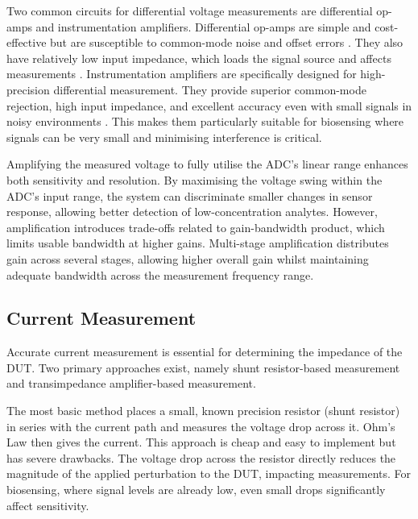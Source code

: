 Two common circuits for differential voltage measurements are differential op-amps and instrumentation amplifiers. Differential op-amps are simple and cost-effective but are susceptible to common-mode noise and offset errors \cite{technologyWhatAreDrawbacks2024}. They also have relatively low input impedance, which loads the signal source and affects measurements \cite{technologyWhatAreDrawbacks2024}. Instrumentation amplifiers are specifically designed for high-precision differential measurement. They provide superior common-mode rejection, high input impedance, and excellent accuracy even with small signals in noisy environments \cite{InstrumentationAmplifierOperational}. This makes them particularly suitable for biosensing where signals can be very small and minimising interference is critical.

Amplifying the measured voltage to fully utilise the \ac{ADC}'s linear range enhances both sensitivity and resolution. By maximising the voltage swing within the \ac{ADC}'s input range, the system can discriminate smaller changes in sensor response, allowing better detection of low-concentration analytes. However, amplification introduces trade-offs related to gain-bandwidth product, which limits usable bandwidth at higher gains. Multi-stage amplification distributes gain across several stages, allowing higher overall gain whilst maintaining adequate bandwidth across the measurement frequency range.

\subsection{Current Measurement}
Accurate current measurement is essential for determining the impedance of the \ac{DUT}. Two primary approaches exist, namely shunt resistor-based measurement and transimpedance amplifier-based measurement.

The most basic method places a small, known precision resistor (shunt resistor) in series with the current path and measures the voltage drop across it. Ohm's Law then gives the current. This approach is cheap and easy to implement but has severe drawbacks. The voltage drop across the resistor directly reduces the magnitude of the applied perturbation to the \ac{DUT}, impacting measurements. For biosensing, where signal levels are already low, even small drops significantly affect sensitivity.

